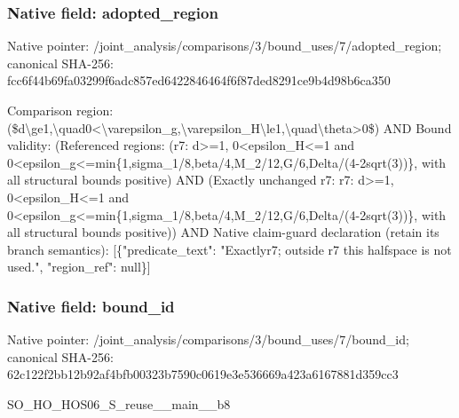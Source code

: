 \documentclass[10pt,a4paper]{article}
\begin{document}
\subsubsection{Native field: adopted\_\allowbreak{}region}
Native pointer: /joint\_\allowbreak{}analysis/comparisons/3/bound\_\allowbreak{}uses/7/adopted\_\allowbreak{}region; canonical SHA-256: fcc6f44b69fa03299f6adc857ed6422846464f6f87ded8291ce9b4d98b6ca350

\begingroup\raggedright\sloppy Comparison region:\allowbreak{} (\$d\textbackslash{}ge1,\allowbreak{}\textbackslash{}quad0<\textbackslash{}varepsilon\_\allowbreak{}g,\allowbreak{}\textbackslash{}varepsilon\_\allowbreak{}H\textbackslash{}le1,\allowbreak{}\textbackslash{}quad\textbackslash{}theta>0\$) AND Bound validity:\allowbreak{} (Referenced regions:\allowbreak{} (r7:\allowbreak{} d>=\allowbreak{}1,\allowbreak{} 0<epsilon\_\allowbreak{}H<=\allowbreak{}1 and 0<epsilon\_\allowbreak{}g<=\allowbreak{}min\{1,\allowbreak{}sigma\_\allowbreak{}1/\allowbreak{}8,\allowbreak{}beta/\allowbreak{}4,\allowbreak{}M\_\allowbreak{}2/\allowbreak{}12,\allowbreak{}G/\allowbreak{}6,\allowbreak{}Delta/\allowbreak{}(4-2sqrt(3))\},\allowbreak{} with all structural bounds positive) AND (Exactly unchanged r7:\allowbreak{} r7:\allowbreak{} d>=\allowbreak{}1,\allowbreak{} 0<epsilon\_\allowbreak{}H<=\allowbreak{}1 and 0<epsilon\_\allowbreak{}g<=\allowbreak{}min\{1,\allowbreak{}sigma\_\allowbreak{}1/\allowbreak{}8,\allowbreak{}beta/\allowbreak{}4,\allowbreak{}M\_\allowbreak{}2/\allowbreak{}12,\allowbreak{}G/\allowbreak{}6,\allowbreak{}Delta/\allowbreak{}(4-2sqrt(3))\},\allowbreak{} with all structural bounds positive)) AND Native claim-guard declaration (retain its branch semantics):\allowbreak{} [\{"predicate\_\allowbreak{}text":\allowbreak{} "Exactlyr7;\allowbreak{} outside r7 this halfspace is not used.",\allowbreak{} "region\_\allowbreak{}ref":\allowbreak{} null\}]\par\endgroup

\subsubsection{Native field: bound\_\allowbreak{}id}
Native pointer: /joint\_\allowbreak{}analysis/comparisons/3/bound\_\allowbreak{}uses/7/bound\_\allowbreak{}id; canonical SHA-256: 62c122f2bb12b92af4bfb00323b7590c0619e3e536669a423a6167881d359cc3

\begingroup\raggedright\sloppy SO\_\allowbreak{}HO\_\allowbreak{}HOS06\_\allowbreak{}S\_\allowbreak{}reuse\_\allowbreak{}\_\allowbreak{}main\_\allowbreak{}\_\allowbreak{}b8\par\endgroup
\end{document}
